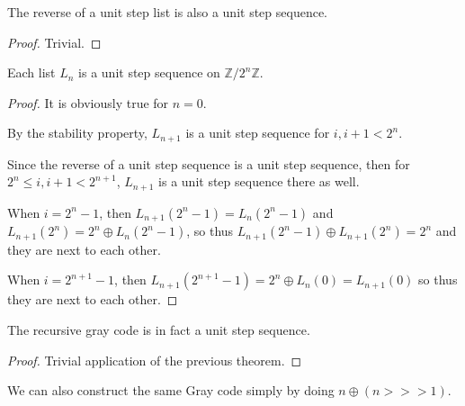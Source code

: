 \begin{lemma}
    \label{thm:reverse_unit_step}
    The reverse of a unit step list is also a unit step sequence.
\end{lemma}

\begin{proof}
    Trivial.
\end{proof}

\begin{theorem}
    \label{thm:list_gray_code_unit_step}

    Each list $L_n$ is a unit step sequence on $\mathbb{Z} / 2^n \mathbb{Z}$.
\end{theorem}

\begin{proof}
    It is obviously true for $n = 0$.

    By the stability property, $L_{n+1}$ is a unit step sequence for $i, i+1 < 2^n$.

    Since the reverse of a unit step sequence is a unit step sequence, then for
    $2^n \le i, i+1 < 2^{n+1}$, $L_{n+1}$ is a unit step sequence there as well.

    When $i = 2^n - 1$, then $L_{n+1}(2^n - 1) = L_{n}(2^n - 1)$ and $L_{n+1}(2^n) = 2^n \oplus L_{n}(2^n - 1)$,
    so thus $L_{n+1}(2^n - 1) \oplus L_{n+1}(2^n) = 2^n$ and they are next to each other.

    When $i = 2^{n+1} - 1$, then $L_{n+1}(2^{n+1} - 1) = 2^n \oplus L_{n}(0) = L_{n+1}(0)$ so thus they are next to each other.
\end{proof}

\begin{theorem}
    \label{thm:recursive_gray_code_unit_step}


    The recursive gray code is in fact a unit step sequence.
\end{theorem}

\begin{proof}
    Trivial application of the previous theorem.
\end{proof}

\begin{definition}
    \label{def:direct_gray_code}
    We can also construct the same Gray code simply by doing $n \oplus (n >>> 1)$.
\end{definition}

